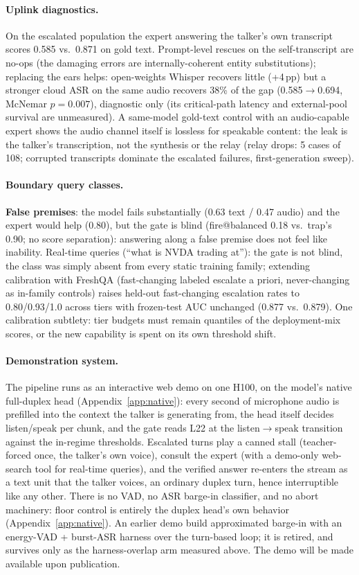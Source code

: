 \paragraph{Uplink diagnostics.} On the escalated population the expert
answering the talker's own transcript scores 0.585 vs.\ 0.871 on gold
text. Prompt-level rescues on the self-transcript are no-ops (the
damaging errors are internally-coherent entity substitutions);
replacing the ears helps: open-weights Whisper recovers little
(+4\,pp) but a stronger cloud ASR on the same audio recovers 38\% of
the gap (0.585$\to$0.694, McNemar $p{=}0.007$), diagnostic only (its
critical-path latency and external-pool survival are unmeasured). A
same-model gold-text control with an audio-capable expert shows the
audio channel itself is lossless for speakable content: the leak is
the talker's transcription, not the synthesis or the relay (relay
drops: 5 cases of 108; corrupted transcripts dominate the escalated
failures, first-generation sweep).

\paragraph{Boundary query classes.} \textbf{False premises}: the model
fails substantially (0.63 text / 0.47 audio) and the expert would help
(0.80), but the gate is blind (fire@balanced 0.18 vs.\ trap's 0.90; no
score separation): answering along a false premise does not feel
like inability. Real-time queries (``what is NVDA trading at''):
the gate is not blind, the class was simply absent from every static
training family; extending calibration with FreshQA
\citep{vu2023freshllms} (fast-changing labeled escalate a priori,
never-changing as in-family controls) raises held-out fast-changing
escalation rates to 0.80/0.93/1.0 across tiers with frozen-test AUC unchanged
(0.877 vs.\ 0.879). One calibration subtlety: tier budgets must remain
quantiles of the deployment-mix scores, or the new capability is
spent on its own threshold shift.

\paragraph{Demonstration system.} The pipeline runs as an interactive
web demo on one H100, on the model's native full-duplex head
(Appendix~\ref{app:native}): every second of microphone audio is
prefilled into the context the talker is generating from, the head
itself decides listen/speak per chunk, and the gate reads L22 at the
listen$\to$speak transition against the in-regime thresholds.
Escalated turns play a canned stall (teacher-forced once, the talker's
own voice), consult the expert (with a demo-only web-search tool for
real-time queries), and the verified answer re-enters the stream as a
text unit that the talker voices, an ordinary duplex turn, hence
interruptible like any other. There is no VAD, no ASR barge-in
classifier, and no abort machinery: floor control is entirely the
duplex head's own behavior (Appendix~\ref{app:native}). An earlier
demo build approximated barge-in with an energy-VAD + burst-ASR
harness over the turn-based loop; it is retired, and survives only as
the harness-overlap arm measured above. The demo will be made
available upon publication.

